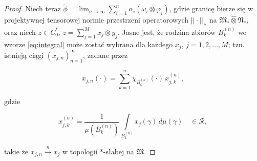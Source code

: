 \begin{proof}
Niech teraz $\tilde{\phi} =\lim_{n\to\infty}\sum_{i=1}^{n}\alpha_i(\omega_{i}\otimes\varphi_{i})$,
gdzie granicę bierze się w projektywnej tensorowej normie przestrzeni operatorowych
$|| \cdot ||_{\wedge}$ na $\mathfrak{M}_{*} \hat{\otimes} \mathfrak{N}_{*}$,
oraz niech $z \in C_{0}^{*}$, $z = \sum_{j=1}^{M} x_{j} \otimes y_{j}$.
Jasne jest, że rodzina zbiorów $B_{k}^{(n)}$ we wzorze \eqref{eq:integral}
może zostać wybrana dla każdego $x_{j}$, $j = 1,2, \ldots, M$; tzn.
istnieją ciągi $(x_{j,n})_{n=1}^{\infty}$, zadane przez
\begin{linenomath*}
 \begin{equation}
x_{j,n}(\cdot) =     \sum \limits_{k=1}^{n} \chi_{B_{k}^{(n)}}(\cdot)
\, x_{j,k}^{(n)},
 \end{equation}
\end{linenomath*}
gdzie
\begin{linenomath*}
 \begin{equation}
\label{eq:integralxes}
x_{j,k}^{(n)} = \frac{1}{\mu(B_{k}^{(n)})}
\int \limits_{B_{k}^{(n)}} x_{j}(\gamma) \, d\mu(\gamma)
\quad \in \mathcal{R},
 \end{equation}
\end{linenomath*}
takie że $x_{j,n} \stackrel{n}{\longrightarrow} x_{j}$
w topologii *-słabej na  $\mathfrak{M}$.


\end{proof}
